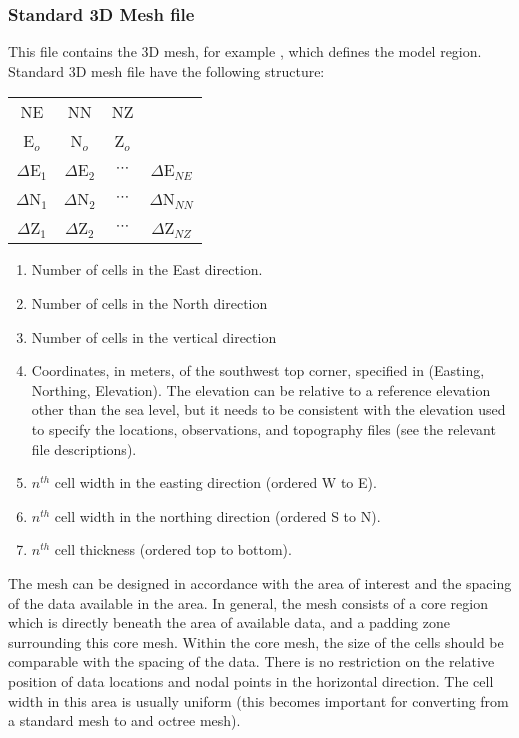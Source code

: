 \subsubsection{Standard 3D Mesh file}

This file contains the 3D mesh, for example , which defines the model region. Standard 3D mesh file have the following structure:

\begin{fileExample}
\begin{tabular}{|cccc|}
\hline
NE & NN & NZ & \\
E$_o$ & N$_o$ & Z$_o$ & \\
$\Delta$E$_1$ & $\Delta$E$_2$ & $\cdots$ & $\Delta$E$_{NE}$ \\
$\Delta$N$_1$ & $\Delta$N$_2$ & $\cdots$ & $\Delta$N$_{NN}$ \\
$\Delta$Z$_1$ & $\Delta$Z$_2$ & $\cdots$ & $\Delta$Z$_{NZ}$ \\
\hline
\end{tabular}
\end{fileExample}
%
\begin{enumerate}
\item[\codeName{NE}] Number of cells in the East direction.
\item[\codeName{NN}] Number of cells in the North direction
\item[\codeName{NZ}] Number of cells in the vertical direction
\item[\codeName{E$_o$ N$_o$ Z$_o$}] Coordinates, in meters, of the southwest top corner, specified in (Easting, Northing, Elevation). The elevation can be relative to a reference elevation other than the sea level, but it needs to be consistent with the elevation used to specify the locations, observations, and topography files (see the relevant file descriptions).
\item[\codeName{$\Delta$E$_n$}] $n^{th}$ cell width in the easting direction (ordered W to E).
\item[\codeName{$\Delta$N$_n$}] $n^{th}$ cell width in the northing direction (ordered S to N).
\item[\codeName{$\Delta$Z$_n$}] $n^{th}$ cell thickness (ordered top to bottom).
\end{enumerate}

The mesh can be designed in accordance with the area of interest and the spacing of the data available in the area. In general, the mesh consists of a core region which is directly beneath the area of available data, and a padding zone surrounding this core mesh. Within the core mesh, the size of the cells should be comparable with the spacing of the data. There is no restriction on the relative position of data locations and nodal points in the horizontal direction. The cell width in this area is usually uniform (this becomes important for converting from a standard mesh to and octree mesh).

